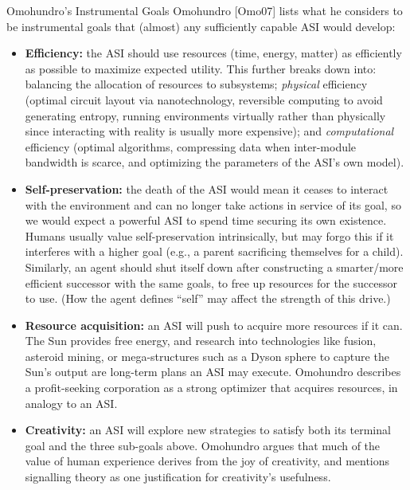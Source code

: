 \documentclass[aspectratio=169,10pt]{beamer}
\begin{document}
\begin{frame}[allowframebreaks]{Omohundro's Instrumental Goals}
  Omohundro [Omo07] lists what he considers to be instrumental goals that
  (almost) any sufficiently capable ASI would develop:

  \begin{itemize}
    \item \textbf{Efficiency:} the ASI should use resources (time, energy,
      matter) as efficiently as possible to maximize expected utility.
      This further breaks down into: balancing the allocation of
      resources to subsystems; \emph{physical} efficiency (optimal
      circuit layout via nanotechnology, reversible computing to avoid
      generating entropy, running environments virtually rather than
      physically since interacting with reality is usually more
      expensive); and \emph{computational} efficiency (optimal algorithms,
      compressing data when inter-module bandwidth is scarce, and
      optimizing the parameters of the ASI's own model).
    \item \textbf{Self-preservation:} the death of the ASI would mean it
      ceases to interact with the environment and can no longer take
      actions in service of its goal, so we would expect a powerful ASI to
      spend time securing its own existence. Humans usually value
      self-preservation intrinsically, but may forgo this if it interferes
      with a higher goal (e.g., a parent sacrificing themselves for a
      child). Similarly, an agent should shut itself down after
      constructing a smarter/more efficient successor with the same
      goals, to free up resources for the successor to use. (How the
      agent defines ``self'' may affect the strength of this drive.)

    \framebreak

    \item \textbf{Resource acquisition:} an ASI will push to acquire more
      resources if it can. The Sun provides free energy, and research
      into technologies like fusion, asteroid mining, or mega-structures
      such as a Dyson sphere to capture the Sun's output are long-term
      plans an ASI may execute. Omohundro describes a profit-seeking
      corporation as a strong optimizer that acquires resources, in
      analogy to an ASI.
    \item \textbf{Creativity:} an ASI will explore new strategies to
      satisfy both its terminal goal and the three sub-goals above.
      Omohundro argues that much of the value of human experience derives
      from the joy of creativity, and mentions signalling theory as one
      justification for creativity's usefulness.
  \end{itemize}
\end{frame}
\end{document}
